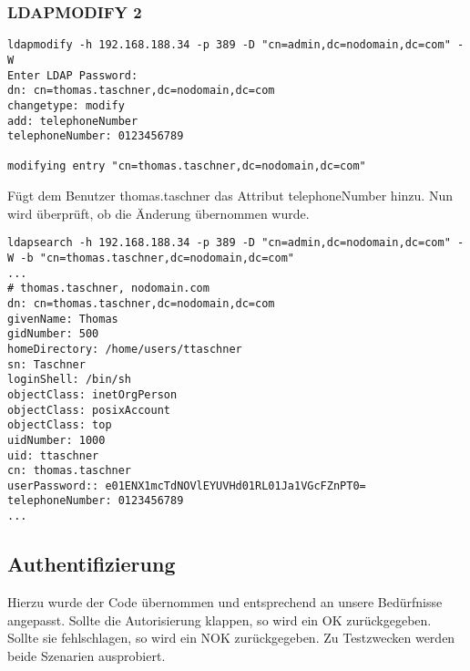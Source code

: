 \subsubsection{LDAPMODIFY 2}
\label{sec:LDAPMODIFY 2}

\begin{lstlisting}[frame=single, caption=LDAPMODIFY 2]
ldapmodify -h 192.168.188.34 -p 389 -D "cn=admin,dc=nodomain,dc=com" -W
Enter LDAP Password: 
dn: cn=thomas.taschner,dc=nodomain,dc=com
changetype: modify
add: telephoneNumber
telephoneNumber: 0123456789

modifying entry "cn=thomas.taschner,dc=nodomain,dc=com"

\end{lstlisting}

Fügt dem Benutzer thomas.taschner das Attribut telephoneNumber hinzu.
Nun wird überprüft, ob die Änderung übernommen wurde.

\begin{lstlisting}[frame=single, caption=LDAPMODIFY 2 Check]
ldapsearch -h 192.168.188.34 -p 389 -D "cn=admin,dc=nodomain,dc=com" -W -b "cn=thomas.taschner,dc=nodomain,dc=com"
...
# thomas.taschner, nodomain.com
dn: cn=thomas.taschner,dc=nodomain,dc=com
givenName: Thomas
gidNumber: 500
homeDirectory: /home/users/ttaschner
sn: Taschner
loginShell: /bin/sh
objectClass: inetOrgPerson
objectClass: posixAccount
objectClass: top
uidNumber: 1000
uid: ttaschner
cn: thomas.taschner
userPassword:: e01ENX1mcTdNOVlEYUVHd01RL01Ja1VGcFZnPT0=
telephoneNumber: 0123456789
...

\end{lstlisting}
\newpage


\subsection{Authentifizierung}
\label{sec:Authentifizierung}
Hierzu wurde der Code \cite{StackoverflowAuthenticate} übernommen und entsprechend an unsere Bedürfnisse angepasst. Sollte die Autorisierung klappen, so wird ein OK zurückgegeben. Sollte sie fehlschlagen, so wird ein NOK zurückgegeben. Zu Testzwecken werden beide Szenarien ausprobiert.

